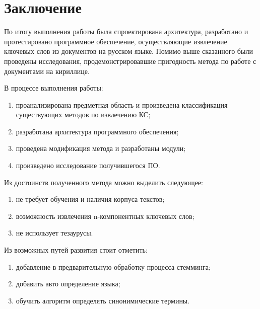 \section{Заключение}
По итогу выполнения работы была спроектирована архитектура, разработано и протестировано программное обеспечение, осуществляющие извлечение ключевых слов из документов на русском языке.
Помимо выше сказанного были проведены исследования, продемонстрировавшие пригодность метода по работе с документами на кириллице.

В процессе выполнения работы:
\begin{enumerate}
	\item проанализирована предметная область и произведена классификация существующих методов по извлечению КС;
	\item разработана архитектура программного обеспечения;
	\item проведена модификация метода и разработаны модули;
	\item произведено исследование получившегося ПО.
\end{enumerate}

Из достоинств полученного метода можно выделить следующее:
\begin{enumerate}
	\item не требует обучения и наличия корпуса текстов;
	\item возможность извлечения n-компонентных ключевых слов;
	\item не использует тезаурусы. 
\end{enumerate}

Из возможных путей развития стоит отметить:
\begin{enumerate}
	\item добавление в предварительную обработку процесса стемминга;
	\item добавить авто определение языка;
	\item обучить алгоритм определять синонимические термины.
\end{enumerate}